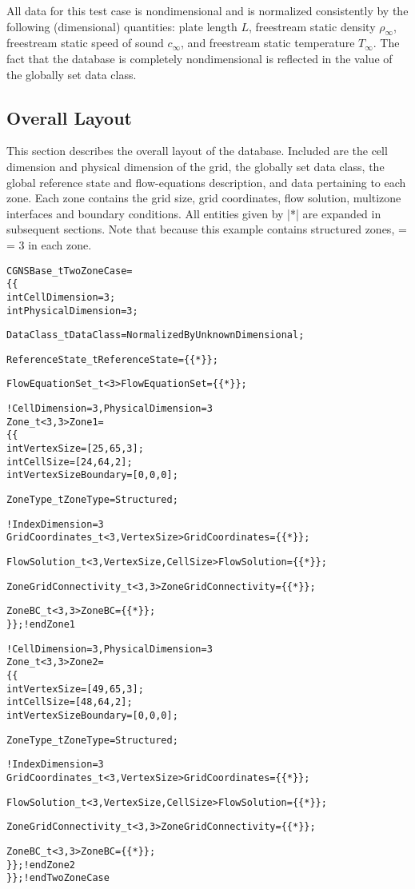 All data for this test case is nondimensional and is normalized
consistently by the following (dimensional) quantities: plate length
$L$, freestream static density $\rho_\infty$, freestream static speed
of sound $c_\infty$, and freestream static temperature $T_\infty$.  The
fact that the database is completely nondimensional is reflected in the
value of the globally set data class.

\subsection{Overall Layout}
\label{s:flatplate_layout}

This section describes the overall layout of the database.  Included are
the cell dimension and physical dimension of the grid, the globally set
data class, the global reference state and flow-equations description,
and data pertaining to each zone.  Each zone contains the grid size,
grid coordinates, flow solution, multizone interfaces and boundary
conditions.  All entities given by |{{*}}| are expanded in subsequent
sections.  Note that because this example contains structured zones,
 =  = 3 in each zone.
\begin{alltt}
CGNSBase\_t TwoZoneCase =
  \{\{
  int CellDimension = 3 ;
  int PhysicalDimension = 3 ;

  DataClass\_t DataClass = NormalizedByUnknownDimensional ;

  ReferenceState\_t ReferenceState = \{\{*\}\} ;
  
  FlowEquationSet\_t<3> FlowEquationSet = \{\{*\}\} ;

  !  CellDimension = 3, PhysicalDimension = 3
  Zone\_t<3,3> Zone1 =
    \{\{
    int VertexSize = [25,65,3] ;
    int CellSize   = [24,64,2] ;
    int VertexSizeBoundary = [0,0,0];

    ZoneType\_t ZoneType = Structured;
    
    !  IndexDimension = 3
    GridCoordinates\_t<3,VertexSize> GridCoordinates = \{\{*\}\} ;
    
    FlowSolution\_t<3,VertexSize,CellSize> FlowSolution = \{\{*\}\} ;
    
    ZoneGridConnectivity\_t<3,3> ZoneGridConnectivity = \{\{*\}\} ;
  
    ZoneBC\_t<3,3> ZoneBC = \{\{*\}\} ;
    \}\} ;        ! end Zone1
  
  !  CellDimension = 3, PhysicalDimension = 3
  Zone\_t<3,3> Zone2 =
    \{\{
    int VertexSize = [49,65,3] ;
    int CellSize   = [48,64,2] ;
    int VertexSizeBoundary = [0,0,0];

    ZoneType\_t ZoneType = Structured;
    
    !  IndexDimension = 3
    GridCoordinates\_t<3,VertexSize> GridCoordinates = \{\{*\}\} ;
    
    FlowSolution\_t<3,VertexSize,CellSize> FlowSolution = \{\{*\}\} ;
    
    ZoneGridConnectivity\_t<3,3> ZoneGridConnectivity = \{\{*\}\} ;
  
    ZoneBC\_t<3,3> ZoneBC = \{\{*\}\} ;
    \}\} ;        ! end Zone2
  \}\} ;          ! end TwoZoneCase
\end{alltt}

